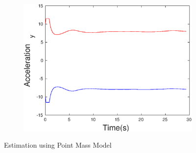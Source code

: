 \begin{figure}[h]
\begin{subfigure}{.5\linewidth}
\end{subfigure}
\begin{subfigure}{.5\linewidth}
\centering
\includegraphics[width=.9\linewidth]{figures/Frad/s3pmSMAcceleration_y}
\end{subfigure}
\caption{Estimation using Point Mass Model}
\end{figure}

\clearpage
